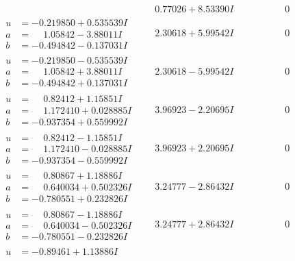 \documentclass[1p]{elsarticle_modified}
\theoremstyle{definition}
\begin{document}
$$\begin{array}{c|c|c}
 & \phantom{-}0.77026 + 8.53390 I & \phantom{-0.000000 } 0 \\ \hline\begin{aligned}
u &= -0.219850 + 0.535539 I \\
a &= \phantom{-}1.05842 - 3.88011 I \\
b &= -0.494842 - 0.137031 I\end{aligned}
 & \phantom{-}2.30618 + 5.99542 I & \phantom{-0.000000 } 0 \\ \hline\begin{aligned}
u &= -0.219850 - 0.535539 I \\
a &= \phantom{-}1.05842 + 3.88011 I \\
b &= -0.494842 + 0.137031 I\end{aligned}
 & \phantom{-}2.30618 - 5.99542 I & \phantom{-0.000000 } 0 \\ \hline\begin{aligned}
u &= \phantom{-}0.82412 + 1.15851 I \\
a &= \phantom{-}1.172410 + 0.028885 I \\
b &= -0.937354 + 0.559992 I\end{aligned}
 & \phantom{-}3.96923 - 2.20695 I & \phantom{-0.000000 } 0 \\ \hline\begin{aligned}
u &= \phantom{-}0.82412 - 1.15851 I \\
a &= \phantom{-}1.172410 - 0.028885 I \\
b &= -0.937354 - 0.559992 I\end{aligned}
 & \phantom{-}3.96923 + 2.20695 I & \phantom{-0.000000 } 0 \\ \hline\begin{aligned}
u &= \phantom{-}0.80867 + 1.18886 I \\
a &= \phantom{-}0.640034 + 0.502326 I \\
b &= -0.780551 + 0.232826 I\end{aligned}
 & \phantom{-}3.24777 - 2.86432 I & \phantom{-0.000000 } 0 \\ \hline\begin{aligned}
u &= \phantom{-}0.80867 - 1.18886 I \\
a &= \phantom{-}0.640034 - 0.502326 I \\
b &= -0.780551 - 0.232826 I\end{aligned}
 & \phantom{-}3.24777 + 2.86432 I & \phantom{-0.000000 } 0 \\ \hline\begin{aligned}
u &= -0.89461 + 1.13886 I \\

\end{aligned}
\end{array}$$
\end{document}
